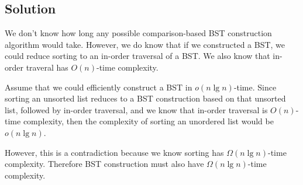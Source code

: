 \subsection*{Solution}

We don't know how long any possible comparison-based BST construction algorithm would take. However, we do know that if we constructed a BST, we could reduce sorting to an in-order traversal of a BST. We also know that in-order traveral has $O(n)$-time complexity. 

Assume that we could efficiently construct a BST in $o(n \lg n)$-time. Since sorting an unsorted list reduces to a BST construction based on that unsorted list, followed by in-order traversal, and we know that in-order traversal is $O(n)$-time complexity, then the complexity of sorting an unordered list would be $o(n \lg n)$. 

However, this is a contradiction because we know sorting has $\Omega(n \lg n)$-time complexity. Therefore BST construction must also have $\Omega(n \lg n)$-time complexity.
